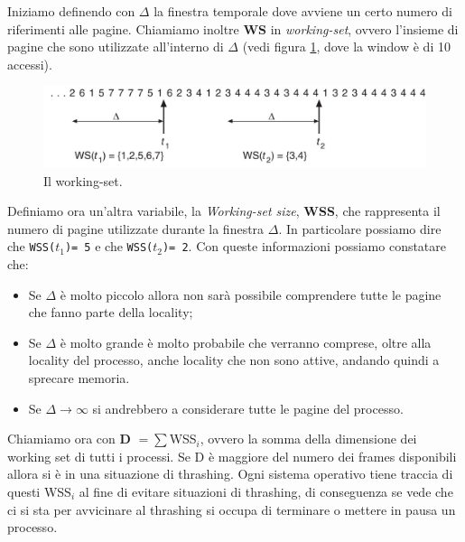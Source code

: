 Iniziamo definendo con $\Delta$ la finestra temporale dove avviene un certo numero di riferimenti alle pagine. Chiamiamo inoltre \textbf{WS} in \textit{working-set}, ovvero l'insieme di pagine che sono utilizzate all'interno di $\Delta$ (vedi figura \ref{fig:working-set}, dove la window è di 10 accessi).
\begin{figure}[h]
    \centering
    \includegraphics[width = .75\textwidth]{../res/imgs/virtual memory/working-set.png}
    \caption{Il working-set.}
    \label{fig:working-set}
\end{figure}
Definiamo ora un'altra variabile, la \textit{Working-set size}, \textbf{WSS}, che rappresenta il numero di pagine utilizzate durante la finestra $\Delta$. In particolare possiamo dire che \texttt{WSS($t_{1}$)= 5} e che \texttt{WSS($t_{2}$)= 2}. Con queste informazioni possiamo constatare che:
\vspace{-4px}
\begin{itemize}
\setlength{\itemsep}{-1px}
    \item Se $\Delta$ è molto piccolo allora non sarà possibile comprendere tutte le pagine che fanno parte della locality;
    \item Se $\Delta$ è molto grande è molto probabile che verranno comprese, oltre alla locality del processo, anche locality che non sono attive, andando quindi a sprecare memoria. 
    \item Se $\Delta \to \infty$ si andrebbero a considerare tutte le pagine del processo.
\end{itemize}
\vspace{-4px}
Chiamiamo ora con \textbf{D} $= \sum$WSS$_i$, ovvero la somma della dimensione dei working set di tutti i processi. Se D è maggiore del numero dei frames disponibili allora si è in una situazione di thrashing. Ogni sistema operativo tiene traccia di questi WSS$_i$ al fine di evitare situazioni di thrashing, di conseguenza se vede che ci si sta per avvicinare al thrashing si occupa di terminare o mettere in pausa un processo.

% 

